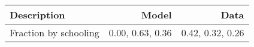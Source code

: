 \begin{tabular}{lrr}
\hline
Description & Model  & Data  \\ 
\hline
Fraction by schooling & 0.00, 0.63, 0.36  & 0.42, 0.32, 0.26  \\ 
\hline
\end{tabular}%
